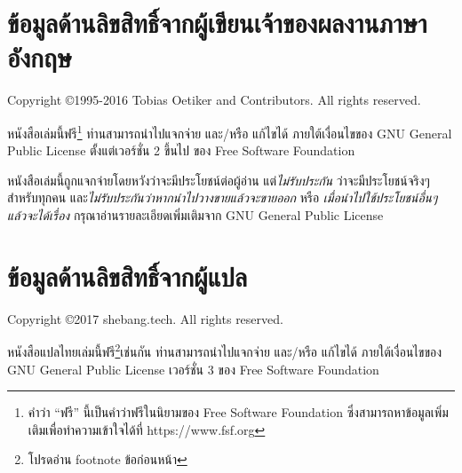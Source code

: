 \section*{ข้อมูลด้านลิขสิทธิ์จากผู้เขียนเจ้าของผลงานภาษาอังกฤษ}

Copyright \copyright 1995-2016 Tobias Oetiker and
Contributors.  All rights reserved.

หนังสือเล่มนี้ฟรี\footnote{คำว่า ``ฟรี'' นี้เป็นคำว่าฟรีในนิยามของ Free Software
Foundation ซึ่งสามารถหาข้อมูลเพิ่มเติมเพื่อทำความเข้าใจได้ที่ https://www.fsf.org}
ท่านสามารถนำไปแจกจ่าย และ/หรือ แก้ไขได้ ภายใต้เงื่อนไขของ GNU General Public
License ตั้งแต่เวอร์ชั่น 2 ขึ้นไป ของ Free Software Foundation 

หนังสือเล่มนี้ถูกแจกจ่ายโดยหวังว่าจะมีประโยชน์ต่อผู้อ่าน แต่\emph{ไม่รับประกัน}
ว่าจะมีประโยชน์จริงๆสำหรับทุกคน และ\emph{ไม่รับประกันว่าหากนำไปวางขายแล้วจะขายออก}
หรือ \emph{เมื่อนำไปใช้ประโยชน์อื่นๆแล้วจะได้เรื่อง} กรุณาอ่านรายละเอียดเพิ่มเติมจาก GNU
General Public License

\section*{ข้อมูลด้านลิขสิทธิ์จากผู้แปล}

Copyright \copyright 2017 shebang.tech.  All rights reserved.

หนังสือแปลไทยเล่มนี้ฟรี\footnote{โปรดอ่าน footnote ข้อก่อนหน้า}เช่นกัน
ท่านสามารถนำไปแจกจ่าย และ/หรือ แก้ไขได้ ภายใต้เงื่อนไขของ GNU General Public
License เวอร์ชั่น 3 ของ Free Software Foundation

